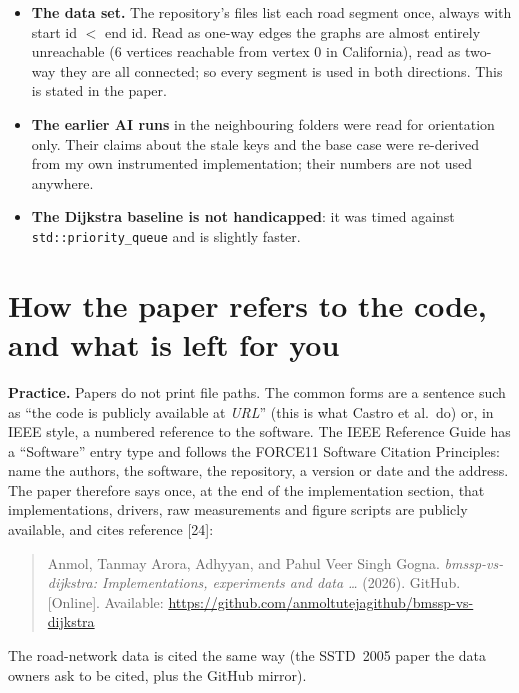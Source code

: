 \documentclass[11pt,a4paper]{article}
\newcommand{\code}[1]{\texttt{#1}}
\begin{document}
\begin{itemize}
\item \textbf{The data set.} The repository's files list each road segment once, always with start id $<$ end id. Read as one-way edges the graphs are almost entirely unreachable (6 vertices reachable from vertex 0 in California), read as two-way they are all connected; so every segment is used in both directions. This is stated in the paper.
\item \textbf{The earlier AI runs} in the neighbouring folders were read for orientation only. Their claims about the stale keys and the base case were re-derived from my own instrumented implementation; their numbers are not used anywhere.
\item \textbf{The Dijkstra baseline is not handicapped}: it was timed against \code{std::priority\_queue} and is slightly faster.
\end{itemize}

\section{How the paper refers to the code, and what is left for you}
\textbf{Practice.} Papers do not print file paths. The common forms are a sentence such as ``the code is publicly available at \emph{URL}'' (this is what Castro et al.\ do) or, in IEEE style, a numbered reference to the software. The IEEE Reference Guide has a ``Software'' entry type and follows the FORCE11 Software Citation Principles: name the authors, the software, the repository, a version or date and the address. The paper therefore says once, at the end of the implementation section, that implementations, drivers, raw measurements and figure scripts are publicly available, and cites reference [24]:
\begin{quote}\small
Anmol, Tanmay Arora, Adhyyan, and Pahul Veer Singh Gogna. \emph{bmssp-vs-dijkstra: Implementations, experiments and data \dots} (2026). GitHub. [Online]. Available: \url{https://github.com/anmoltutejagithub/bmssp-vs-dijkstra}
\end{quote}
The road-network data is cited the same way (the SSTD~2005 paper the data owners ask to be cited, plus the GitHub mirror).
\end{document}
